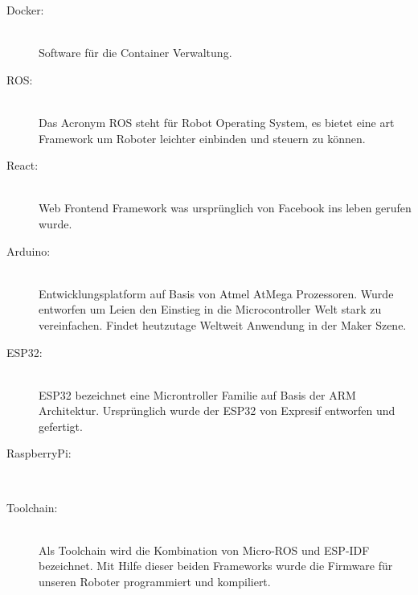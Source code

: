 \begin{flushleft}
    \begin{description}
        \item[Docker:]\hfill\\
        Software für die Container Verwaltung.

        \item[ROS:]\hfill\\
        Das Acronym ROS steht für Robot Operating System, es bietet eine art Framework um Roboter leichter
        einbinden und steuern zu können.

        \item[React:]\hfill\\
        Web Frontend Framework was ursprünglich von Facebook ins leben gerufen wurde.

        \item[Arduino:]\hfill\\
        Entwicklungsplatform auf Basis von Atmel AtMega Prozessoren. Wurde entworfen um Leien den Einstieg in die Microcontroller
        Welt stark zu vereinfachen. Findet heutzutage Weltweit Anwendung in der Maker Szene.

        \item[ESP32:]\hfill\\
        ESP32 bezeichnet eine Microntroller Familie auf Basis der ARM Architektur.
        Ursprünglich wurde der ESP32 von Expresif entworfen und gefertigt.

        \item[RaspberryPi:]\hfill\\
        
        \item[Toolchain:] \hfill\\
        Als Toolchain wird die Kombination von Micro-ROS und ESP-IDF bezeichnet.
        Mit Hilfe dieser beiden Frameworks wurde die Firmware für unseren Roboter programmiert und kompiliert.
        \end{description}
\end{flushleft}